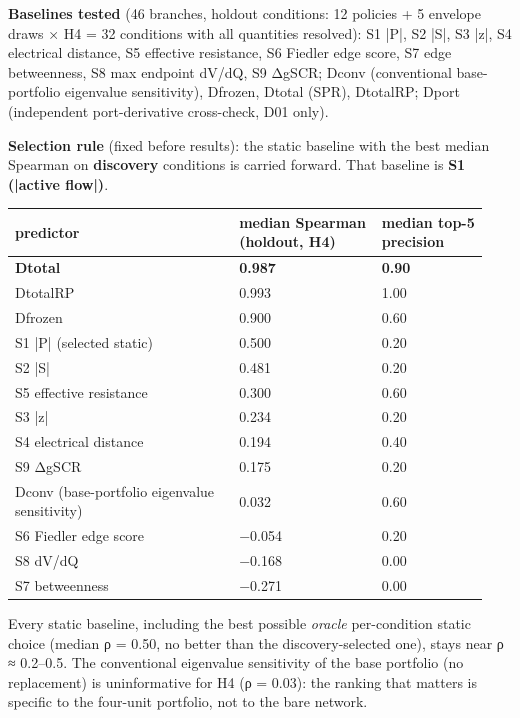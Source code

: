 \documentclass[10pt,a4paper]{article}
\begin{document}
\textbf{Baselines tested} (46 branches, holdout conditions: 12 policies + 5 envelope draws × H4 = 32 conditions with all quantities resolved): S1 |P|, S2 |S|, S3 |z|, S4 electrical distance, S5 effective resistance, S6 Fiedler edge score, S7 edge betweenness, S8 max endpoint dV/dQ, S9 ΔgSCR; Dconv (conventional base-portfolio eigenvalue sensitivity), Dfrozen, Dtotal (SPR), DtotalRP; Dport (independent port-derivative cross-check, D01 only).

\textbf{Selection rule} (fixed before results): the static baseline with the best median Spearman on \textbf{discovery} conditions is carried forward. That baseline is \textbf{S1 (|active flow|)}.

{\small
\begin{longtable}{L{0.441\linewidth}L{0.284\linewidth}L{0.215\linewidth}}
\toprule
\textbf{predictor} & \textbf{median Spearman (holdout, H4)} & \textbf{median top-5 precision} \\
\midrule
\endhead
\textbf{Dtotal} & \textbf{0.987} & \textbf{0.90} \\
DtotalRP & 0.993 & 1.00 \\
Dfrozen & 0.900 & 0.60 \\
S1 |P| (selected static) & 0.500 & 0.20 \\
S2 |S| & 0.481 & 0.20 \\
S5 effective resistance & 0.300 & 0.60 \\
S3 |z| & 0.234 & 0.20 \\
S4 electrical distance & 0.194 & 0.40 \\
S9 ΔgSCR & 0.175 & 0.20 \\
Dconv (base-portfolio eigenvalue sensitivity) & 0.032 & 0.60 \\
S6 Fiedler edge score & −0.054 & 0.20 \\
S8 dV/dQ & −0.168 & 0.00 \\
S7 betweenness & −0.271 & 0.00 \\
\bottomrule
\end{longtable}}
Every static baseline, including the best possible \emph{oracle} per-condition static choice (median ρ = 0.50, no better than the discovery-selected one), stays near ρ ≈ 0.2–0.5. The conventional eigenvalue sensitivity of the base portfolio (no replacement) is uninformative for H4 (ρ = 0.03): the ranking that matters is specific to the four-unit portfolio, not to the bare network.
\end{document}

